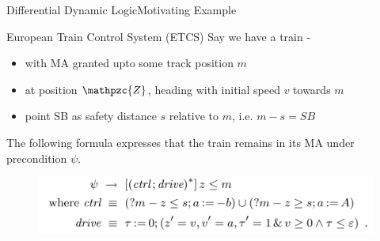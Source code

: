 \documentclass{beamer}
\newcommand{\z}{\mathpzc{Z}}
\begin{document}
\begin{frame}{Differential Dynamic Logic}{Motivating Example}
  \begin{block}{European Train Control System (ETCS)}
    Say we have a train -
    \begin{itemize}
      \item with MA granted upto some track position $m$
      \item at position $\z$, heading with initial speed $v$ towards $m$
      \item point SB as safety distance $s$ relative to $m$, i.e. $m-s = SB$
    \end{itemize}
    \pause
    The following formula expresses that the train remains in its MA under precondition $\psi$.
    \begin{figure}
      \includegraphics[scale=0.4]{ects-safety}
    \end{figure}
  \end{block}
  \end{frame}
\end{document}
